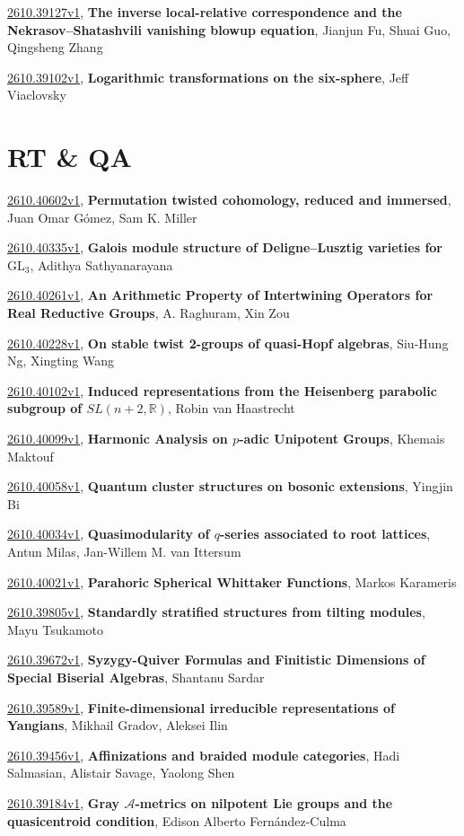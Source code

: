 \documentclass[9pt, a4paper]{article}
\theoremstyle{plain}
\theoremstyle{definition}
\theoremstyle{remark}
\newcommand{\arxiv}[3]{\href{https://arxiv.org/abs/#1}{#1}, \textbf{\textcolor{arxivblue}{#2}}, #3}
\begin{document}
\arxiv{2610.39127v1}{The inverse local-relative correspondence and the Nekrasov--Shatashvili vanishing blowup equation}{Jianjun Fu, Shuai Guo, Qingsheng Zhang}

\arxiv{2610.39102v1}{Logarithmic transformations on the six-sphere}{Jeff Viaclovsky}


\section{RT \& QA}
\arxiv{2610.40602v1}{Permutation twisted cohomology, reduced and immersed}{Juan Omar Gómez, Sam K. Miller}

\arxiv{2610.40335v1}{Galois module structure of Deligne--Lusztig varieties for $\mathrm{GL}_3$}{Adithya Sathyanarayana}

\arxiv{2610.40261v1}{An Arithmetic Property of Intertwining Operators for Real Reductive Groups}{A. Raghuram, Xin Zou}

\arxiv{2610.40228v1}{On stable twist 2-groups of quasi-Hopf algebras}{Siu-Hung Ng, Xingting Wang}

\arxiv{2610.40102v1}{Induced representations from the Heisenberg parabolic subgroup of $SL(n+2,\mathbb{R})$}{Robin van Haastrecht}

\arxiv{2610.40099v1}{Harmonic Analysis on $p$-adic Unipotent Groups}{Khemais Maktouf}

\arxiv{2610.40058v1}{Quantum cluster structures on bosonic extensions}{Yingjin Bi}

\arxiv{2610.40034v1}{Quasimodularity of $q$-series associated to root lattices}{Antun Milas, Jan-Willem M. van Ittersum}

\arxiv{2610.40021v1}{Parahoric Spherical Whittaker Functions}{Markos Karameris}

\arxiv{2610.39805v1}{Standardly stratified structures from tilting modules}{Mayu Tsukamoto}

\arxiv{2610.39672v1}{Syzygy-Quiver Formulas and Finitistic Dimensions of Special Biserial Algebras}{Shantanu Sardar}

\arxiv{2610.39589v1}{Finite-dimensional irreducible representations of Yangians}{Mikhail Gradov, Aleksei Ilin}

\arxiv{2610.39456v1}{Affinizations and braided module categories}{Hadi Salmasian, Alistair Savage, Yaolong Shen}

\arxiv{2610.39184v1}{Gray $\mathcal{A}$-metrics on nilpotent Lie groups and the quasicentroid condition}{Edison Alberto Fernández-Culma}
\end{document}
